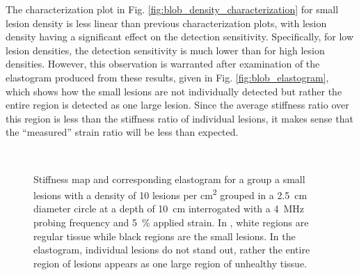 			The characterization plot in Fig. \ref{fig:blob_density_characterization} for small lesion density is less linear than previous characterization plots, with lesion density having a significant effect on the detection sensitivity. Specifically, for low lesion densities, the detection sensitivity is much lower than for high lesion densities. However, this observation is warranted after examination of the elastogram produced from these results, given in Fig. \ref{fig:blob_elastogram}, which shows how the small lesions are not individually detected but rather the entire region is detected as one large lesion. Since the average stiffness ratio over this region is less than the stiffness ratio of individual lesions, it makes sense that the ``measured'' strain ratio will be less than expected.

			\begin{figure}[!htb]
				\centering
				~
				\caption[Sample elastogram for a set of clustered lesions]{Stiffness map \protect{} and corresponding elastogram \protect{} for a group a small lesions with a density of 10 lesions per \si{\cm\squared} grouped in a \SI{2.5}{\cm} diameter circle at a depth of \SI{10}{\cm} interrogated with a \SI{4}{\MHz} probing frequency and \SI{5}{\percent} applied strain. In \protect{}, white regions are regular tissue while black regions are the small lesions. In the elastogram, individual lesions do not stand out, rather the entire region of lesions appears as one large region of unhealthy tissue.}

\end{figure}
